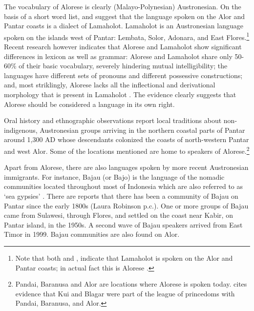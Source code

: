 The vocabulary of Alorese is clearly (Malayo-Polynesian) Austronesian. On the basis of a short word list, \citet[9]{Stokhof1975} and \citet[645]{Steinhauer1993} suggest that the language spoken on the Alor and Pantar coasts is a dialect of Lamaholot. Lamaholot is an Austronesian language spoken on the islands west of Pantar: Lembata, Solor, Adonara, and East Flores.\footnote{Note that both \citet[275]{Barnes2001} and \citet[82]{Blust2009}, \citet[87]{Blust2013} indicate that Lamaholot is spoken on the Alor and Pantar coasts; in actual fact this is Alorese \citep[cf.][]{Klamer2011}.} Recent research however indicates that Alorese and Lamaholot show significant differences in lexicon as well as grammar: Alorese and Lamaholot share only 50-60\% of their basic vocabulary, severely hindering mutual intelligibility; the languages have different sets of pronouns and different possessive constructions; and, most striklingly, Alorese lacks all the inflectional and derivational morphology that is present in Lamaholot \citep{Klamer2011,Klamer2012}. The evidence clearly suggests that Alorese should be considered a language in its own right. 

Oral history and ethnographic observations \citep{Anonymous1914,Lemoine1969,Rodemeier2006} report local traditions about non-indigenous, Austronesian groups arriving in {the northern coastal parts of Pantar around 1,300 AD whose} descendants colonized the coasts of north-western Pantar and west Alor. Some of the locations mentioned are home to speakers of Alorese.\footnote{Pandai, Baranusa and Alor are locations where Alorese is spoken today. \citet[38]{Hagerdal2012} cites evidence that Kui and Blagar were part of the league of princedoms with Pandai, Baranusa, and Alor.}    

Apart from Alorese, there are also languages spoken by more recent Austronesian immigrants. For instance, Bajau (or Bajo) is the language of the nomadic communities located throughout most of Indonesia which are also referred to as `sea gypsies' \citep[cf.][]{Verheijen1986}. There are reports that there has been a community of Bajau on Pantar since the early 1800s (Laura Robinson p.c.). One or more groups of Bajau came from Sulawesi, through Flores, and settled on the coast near Kabir, on Pantar island, in the 1950s. A second wave of Bajau speakers arrived from East Timor in 1999. Bajau communities are also found on Alor. 

